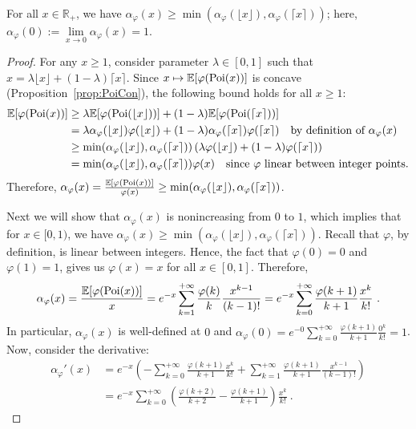 \begin{proposition}
For all $x \in \mathbb{R}_+$, we have $\alpha_{\varphi}(x) \geq \min(\alpha_{\varphi}(\lfloor x \rfloor), \alpha_{\varphi}(\lceil x \rceil))$; here, $\alpha_{\varphi}(0) := \underset{x \rightarrow 0}{\lim} \alpha_{\varphi}(x) = 1$.
  \label{prop:minInt}
\end{proposition}
\begin{proof}
For any $x \geq 1$, consider parameter $\lambda \in [0,1]$ such that $x = \lambda \lfloor x \rfloor + (1-\lambda) \lceil x \rceil$. Since $x \mapsto \mathbb{E}[\varphi(\operatorname{\text{Poi}}(x))]$ is concave (Proposition~\ref{prop:PoiCon}), the following bound holds for all $x \geq 1$:
  \begin{align*}
      \mathbb{E}[\varphi(\operatorname{\text{Poi}}(x))] &\geq \lambda \mathbb{E}[\varphi(\operatorname{\text{Poi}}(\lfloor x \rfloor))] + (1-\lambda) \mathbb{E}[\varphi(\operatorname{\text{Poi}}(\lceil x \rceil))] \\      
      &=  \lambda \alpha_{\varphi}(\lfloor x \rfloor)\varphi(\lfloor x \rfloor) + (1-\lambda) \alpha_{\varphi}(\lceil x \rceil)\varphi(\lceil x \rceil) \quad \text{by definition of $\alpha_{\varphi}(x)$}\\
      &\geq \min(\alpha_{\varphi}(\lfloor x \rfloor), \alpha_{\varphi}(\lceil x \rceil)) \left(\lambda \varphi(\lfloor x \rfloor) + (1-\lambda) \varphi(\lceil x \rceil) \right)\\
      &=  \min(\alpha_{\varphi}(\lfloor x \rfloor), \alpha_{\varphi}(\lceil x \rceil)) \varphi(x) \quad \text{since $\varphi$ linear between integer points.} 
  \end{align*}
Therefore, $\alpha_{\varphi}(x) = \frac{\mathbb{E}[\varphi(\operatorname{\text{Poi}}(x))]}{\varphi(x)} \geq \min(\alpha_{\varphi}(\lfloor x \rfloor), \alpha_{\varphi}(\lceil x \rceil))$.


Next we will show that $\alpha_{\varphi}(x)$ is nonincreasing from $0$ to $1$, which implies that for $x \in [0,1)$, we have $\alpha_{\varphi}(x) \geq  \min(\alpha_{\varphi}(\lfloor x \rfloor), \alpha_{\varphi}(\lceil x \rceil))$.
Recall that $\varphi$, by definition, is linear between integers. Hence, the fact that $\varphi(0) = 0$ and $\varphi(1) = 1$, gives us $\varphi(x) = x$ for all $x \in [0,1]$. Therefore, 
  \[\alpha_{\varphi}(x) = \frac{\mathbb{E}[\varphi(\Poi(x))]}{x} = e^{-x}\sum_{k=1}^{+\infty}\frac{\varphi(k)}{k}\frac{x^{k-1}}{(k-1)!} = e^{-x}\sum_{k=0}^{+\infty}\frac{\varphi(k+1)}{k+1}\frac{x^k}{k!} \ . \]
  In particular, $\alpha_{\varphi}(x)$ is well-defined at $0$ and $\alpha_{\varphi}(0) = e^{-0}\sum_{k=0}^{+\infty}\frac{\varphi(k+1)}{k+1}\frac{0^k}{k!} = 1$. Now, consider the derivative:
  \begin{equation}
    \begin{aligned}
    \alpha_{\varphi}'(x) &= e^{-x}\left(-\sum_{k=0}^{+\infty}\frac{\varphi(k+1)}{k+1}\frac{x^k}{k!} + \sum_{k=1}^{+\infty}\frac{\varphi(k+1)}{k+1}\frac{x^{k-1}}{(k-1)!} \right)\\
    &= e^{-x}\sum_{k=0}^{+\infty}\left(\frac{\varphi(k+2)}{k+2} - \frac{\varphi(k+1)}{k+1} \right)\frac{x^k}{k!} \ .
    \end{aligned}
  \end{equation}


\end{proof}
